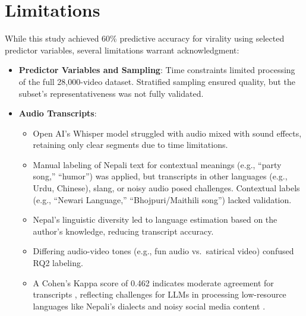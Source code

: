\documentclass[12pt,a4paper]{report}
\begin{document}
\section{Limitations}
\label{limitation}
While this study achieved 60\% predictive accuracy for virality using selected predictor variables, several limitations warrant acknowledgment:

\begin{itemize}
    \item \textbf{Predictor Variables and Sampling}: Time constraints limited processing of the full 28,000-video dataset. Stratified sampling ensured quality, but the subset’s representativeness was not fully validated.

    \item \textbf{Audio Transcripts}: 
        \begin{itemize}
            \item Open AI’s Whisper model struggled with audio mixed with sound effects, retaining only clear segments due to time limitations.
            \item Manual labeling of Nepali text for contextual meanings (e.g., ``party song,'' ``humor'') was applied, but transcripts in other languages (e.g., Urdu, Chinese), slang, or noisy audio posed challenges. Contextual labels (e.g., ``Newari Language,'' ``Bhojpuri/Maithili song'') lacked validation.
            \item Nepal’s linguistic diversity led to language estimation based on the author’s knowledge, reducing transcript accuracy.
            \item Differing audio-video tones (e.g., fun audio vs.\ satirical video) confused RQ2 labeling.
            \item A Cohen’s Kappa score of 0.462 indicates moderate agreement for transcripts \parencite{datatab2025, kolena2025}, reflecting challenges for LLMs in processing low-resource languages like Nepali’s dialects and noisy social media content \parencite{icuc2025, leanmean2023}.
        \end{itemize}


\end{itemize}
\end{document}
